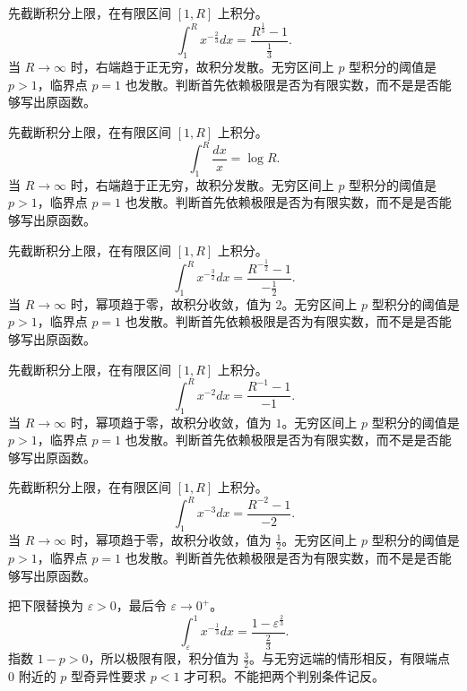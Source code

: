 \documentclass[12pt,fontset=fandol]{ctexart}
\begin{document}
\begin{solve}\label{ans:c19q3}
先截断积分上限，在有限区间 $[1,R]$ 上积分。
\[
\int_1^Rx^{-\frac{2}{3}}dx=\frac{R^{\frac{1}{3}}-1}{\frac{1}{3}}.
\]
当 $R\to\infty$ 时，右端趋于正无穷，故积分发散。无穷区间上 $p$ 型积分的阈值是 $p>1$，临界点 $p=1$ 也发散。判断首先依赖极限是否为有限实数，而不是是否能够写出原函数。
\end{solve}

\begin{solve}\label{ans:c19q4}
先截断积分上限，在有限区间 $[1,R]$ 上积分。
\[
\int_1^R\frac{dx}{x}=\log R.
\]
当 $R\to\infty$ 时，右端趋于正无穷，故积分发散。无穷区间上 $p$ 型积分的阈值是 $p>1$，临界点 $p=1$ 也发散。判断首先依赖极限是否为有限实数，而不是是否能够写出原函数。
\end{solve}

\begin{solve}\label{ans:c19q5}
先截断积分上限，在有限区间 $[1,R]$ 上积分。
\[
\int_1^Rx^{-\frac{3}{2}}dx=\frac{R^{-\frac{1}{2}}-1}{-\frac{1}{2}}.
\]
当 $R\to\infty$ 时，幂项趋于零，故积分收敛，值为 $2$。无穷区间上 $p$ 型积分的阈值是 $p>1$，临界点 $p=1$ 也发散。判断首先依赖极限是否为有限实数，而不是是否能够写出原函数。
\end{solve}

\begin{solve}\label{ans:c19q6}
先截断积分上限，在有限区间 $[1,R]$ 上积分。
\[
\int_1^Rx^{-2}dx=\frac{R^{-1}-1}{-1}.
\]
当 $R\to\infty$ 时，幂项趋于零，故积分收敛，值为 $1$。无穷区间上 $p$ 型积分的阈值是 $p>1$，临界点 $p=1$ 也发散。判断首先依赖极限是否为有限实数，而不是是否能够写出原函数。
\end{solve}

\begin{solve}\label{ans:c19q7}
先截断积分上限，在有限区间 $[1,R]$ 上积分。
\[
\int_1^Rx^{-3}dx=\frac{R^{-2}-1}{-2}.
\]
当 $R\to\infty$ 时，幂项趋于零，故积分收敛，值为 $\frac{1}{2}$。无穷区间上 $p$ 型积分的阈值是 $p>1$，临界点 $p=1$ 也发散。判断首先依赖极限是否为有限实数，而不是是否能够写出原函数。
\end{solve}

\begin{solve}\label{ans:c19q8}
把下限替换为 $\varepsilon>0$，最后令 $\varepsilon\to0^+$。
\[
\int_\varepsilon^1x^{-\frac{1}{3}}dx=\frac{1-\varepsilon^{\frac{2}{3}}}{\frac{2}{3}}.
\]
指数 $1-p>0$，所以极限有限，积分值为 $\frac{3}{2}$。与无穷远端的情形相反，有限端点 $0$ 附近的 $p$ 型奇异性要求 $p<1$ 才可积。不能把两个判别条件记反。
\end{solve}
\end{document}
